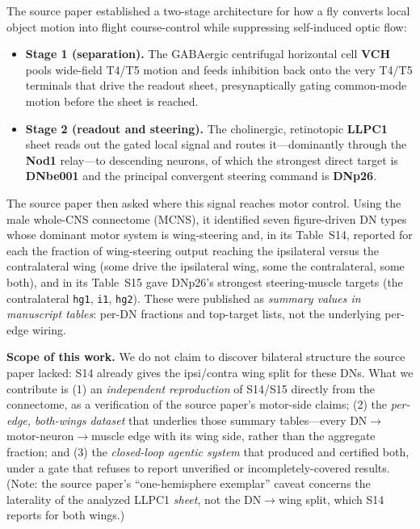 \documentclass[11pt]{article}
\newcommand{\ttt}[1]{\texttt{\small #1}}
\begin{document}
The source paper established a two-stage architecture for how a fly converts local object motion into
flight course-control while suppressing self-induced optic flow:

\begin{itemize}\itemsep1pt
\item \textbf{Stage 1 (separation).} The GABAergic centrifugal horizontal cell \textbf{VCH} pools
wide-field T4/T5 motion and feeds inhibition back onto the very T4/T5 terminals that drive the readout
sheet, presynaptically gating common-mode motion before the sheet is reached.
\item \textbf{Stage 2 (readout and steering).} The cholinergic, retinotopic \textbf{LLPC1} sheet reads
out the gated local signal and routes it---dominantly through the \textbf{Nod1} relay---to descending
neurons, of which the strongest direct target is \textbf{DNbe001} and the principal convergent
steering command is \textbf{DNp26}.
\end{itemize}

\noindent
The source paper then asked where this signal reaches motor control. Using the male whole-CNS
connectome (MCNS), it identified seven figure-driven DN types whose dominant motor system is
wing-steering and, in its Table~S14, reported for each the fraction of wing-steering output reaching
the ipsilateral versus the contralateral wing (some drive the ipsilateral wing, some the
contralateral, some both), and in its Table~S15 gave DNp26's strongest steering-muscle targets (the
contralateral \ttt{hg1}, \ttt{i1}, \ttt{hg2}). These were published as \emph{summary values in
manuscript tables}: per-DN fractions and top-target lists, not the underlying per-edge wiring.

\textbf{Scope of this work.} We do not claim to discover bilateral structure the source paper lacked:
S14 already gives the ipsi/contra wing split for these DNs. What we contribute is (1) an
\emph{independent reproduction} of S14/S15 directly from the connectome, as a verification of the
source paper's motor-side claims; (2) the \emph{per-edge, both-wings dataset} that underlies those
summary tables---every DN$\rightarrow$motor-neuron$\rightarrow$muscle edge with its wing side, rather
than the aggregate fraction; and (3) the \emph{closed-loop agentic system} that produced and certified
both, under a gate that refuses to report unverified or incompletely-covered results. (Note: the source
paper's ``one-hemisphere exemplar'' caveat concerns the laterality of the analyzed LLPC1 \emph{sheet},
not the DN$\rightarrow$wing split, which S14 reports for both wings.)
\end{document}
